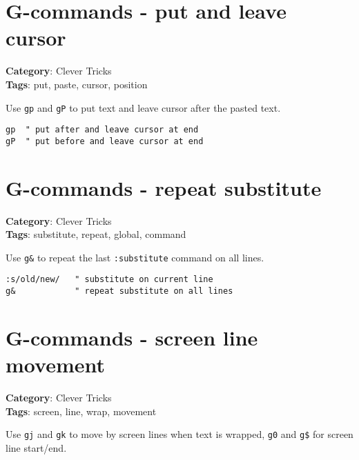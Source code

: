 {{\section{G-commands - put and leave cursor}

\textbf{Category}: Clever Tricks\\ \textbf{Tags}: put, paste, cursor, position
\vspace{0.5cm}

Use {\footnotesize \Verb§gp§} and {\footnotesize \Verb§gP§} to put text and leave cursor after the pasted text.

\begin{Exa*}{}
\begin{Verbatim}[fontsize=\footnotesize, breaklines, breakanywhere]
gp  " put after and leave cursor at end
gP  " put before and leave cursor at end
\end{Verbatim}
\end{Exa*}

\section{G-commands - repeat substitute}

\textbf{Category}: Clever Tricks\\ \textbf{Tags}: substitute, repeat, global, command
\vspace{0.5cm}

Use {\footnotesize \Verb§g&§} to repeat the last {\footnotesize \Verb§:substitute§} command on all lines.

\begin{Exa*}{}
\begin{Verbatim}[fontsize=\footnotesize, breaklines, breakanywhere]
:s/old/new/   " substitute on current line
g&            " repeat substitute on all lines
\end{Verbatim}
\end{Exa*}

\section{G-commands - screen line movement}

\textbf{Category}: Clever Tricks\\ \textbf{Tags}: screen, line, wrap, movement
\vspace{0.5cm}

Use {\footnotesize \Verb§gj§} and {\footnotesize \Verb§gk§} to move by screen lines when text is wrapped, {\footnotesize \Verb§g0§} and {\footnotesize \Verb§g$§} for screen line start/end.

}}
